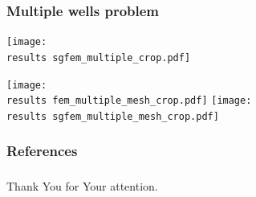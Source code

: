 \documentclass[10pt, xcolor=dvipsnames]{beamer} %
\newcommand{\results}{results/}
\begin{document}
\begin{frame}
  \frametitle{Multiple wells problem}
  \vspace{-10pt}
 \begin{center}
  \begin{minipage}{\linewidth}
    \centering
    \texttt{[image: \\results sgfem\_multiple\_crop.pdf]}
  \end{minipage}

  \begin{minipage}{\linewidth}
    \centering
    \texttt{[image: \\results fem\_multiple\_mesh\_crop.pdf]}
    \texttt{[image: \\results sgfem\_multiple\_mesh\_crop.pdf]} 
  \end{minipage}
 \end{center}
\end{frame}

\begin{frame}
\nocite{deal,mxfem,sgfem,gracie,dip}
  \scriptsize
  \frametitle{References}
  \renewcommand{\refname}{}
  
  
\end{frame}

\begin{frame}
  \frametitle{}
  
  
  \vspace{2cm}
  
  \centering
  Thank You for Your attention.
  
  
\end{frame}


%   
% 
\end{document}

